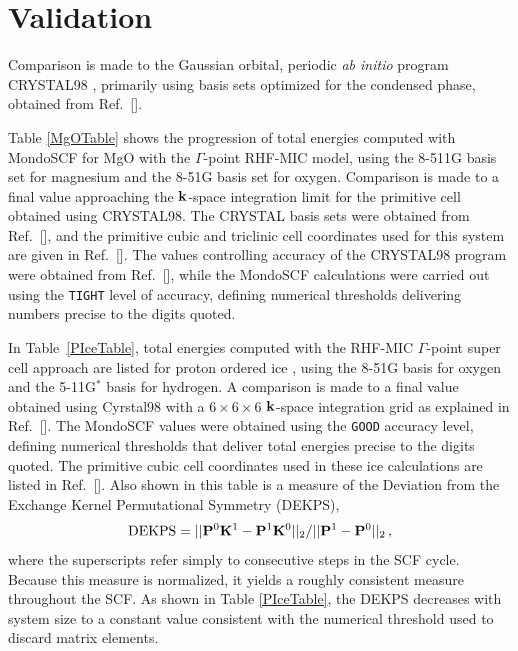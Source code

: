 \documentclass[prb,aps,nobibnotes,twocolumn,doublespace,twocolumngrid,superbib,showpacs]{revtex4}
\begin{document}
\section{Validation} \label{validation}

Comparison is made to the Gaussian orbital, periodic {\em ab initio} program {\sc CRYSTAL98} \cite{CRYSTAL98}, 
primarily using basis sets optimized for the condensed phase, obtained  from Ref.~[].

Table \ref{MgOTable} shows the progression of total energies computed with {\sc MondoSCF} 
for MgO with the  $\Gamma$-point RHF-MIC model, using the 8-511G basis set for magnesium and the 
8-51G basis set for oxygen.   Comparison is made to a final value approaching the ${\bf k}$-space 
integration limit for the primitive cell obtained using {\sc CRYSTAL98}.   The {\sc CRYSTAL} basis 
sets were obtained from Ref.~[], and the primitive cubic and triclinic cell 
coordinates used for this system are given in Ref.~[].   The values 
controlling accuracy of the {\sc CRYSTAL98} program were obtained from Ref.~[], 
while the {\sc MondoSCF} calculations were carried out using the {\tt TIGHT} level of accuracy, 
defining numerical thresholds delivering numbers precise to the digits quoted. 

In Table~\ref{PIceTable}, total energies computed with the RHF-MIC $\Gamma$-point
super cell approach are listed for proton ordered ice \cite{SCasassa97}, using the 8-51G basis 
for oxygen and the 5-11G$^*$ basis for hydrogen.  A comparison is made to a final 
value obtained using {\sc Cyrstal98} with a $6\times6\times6$ ${\bf k}$-space integration grid
as explained in Ref.~[].  The {\sc MondoSCF} values were obtained 
using the {\tt GOOD} accuracy level, defining numerical thresholds that deliver total energies
precise to the digits quoted.
The primitive cubic cell coordinates used in these ice calculations are listed in Ref.~[].      
Also shown in this table is a measure of the 
Deviation from the Exchange Kernel Permutational Symmetry (DEKPS),
\begin{equation}
{\rm DEKPS} = || {\bf P}^0 {\bf K}^1-{\bf P}^1 {\bf K}^0 ||_2/|| {\bf P}^1 - {\bf P}^0||_2 \, ,
\end{equation}
where the superscripts refer simply to consecutive steps in the SCF cycle.  Because this measure
is normalized, it yields a roughly consistent measure throughout the SCF.  As shown in Table \ref{PIceTable},
the DEKPS decreases with system size to a constant value consistent with the numerical threshold used to 
discard matrix elements.   
\end{document}
